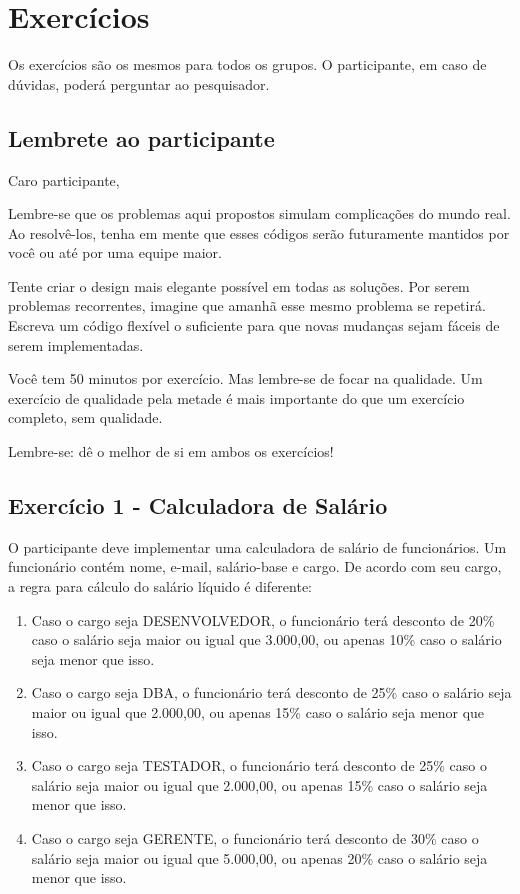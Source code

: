\chapter{Exercícios}
\label{ape:exercicios}

Os exercícios são os mesmos para todos os grupos. O participante, em caso de dúvidas, poderá perguntar ao pesquisador.

\section{Lembrete ao participante}

Caro participante,

Lembre-se que os problemas aqui propostos simulam complicações do mundo real. 
Ao resolvê-los, tenha em mente que esses códigos serão futuramente mantidos
por você ou até por uma equipe maior.

Tente criar o design mais elegante possível em todas as soluções. Por serem problemas
recorrentes, imagine que amanhã esse mesmo problema se repetirá.
Escreva um código flexível o suficiente para que novas mudanças sejam fáceis de serem 
implementadas.

Você tem 50 minutos por exercício. Mas lembre-se de focar na qualidade. Um exercício de 
qualidade pela metade é mais importante do que um exercício completo, sem qualidade.

Lembre-se: dê o melhor de si em ambos os exercícios!

\section{Exercício 1 - Calculadora de Salário}

O participante deve implementar uma calculadora de salário de funcionários. Um
funcionário contém nome, e-mail, salário-base e cargo. De acordo com seu cargo,
a regra para cálculo do salário líquido é diferente:

\begin{enumerate}
	\item Caso o cargo seja DESENVOLVEDOR, o funcionário terá desconto de 20\%
	caso o salário seja maior ou igual que 3.000,00, ou apenas 10\% caso o salário seja menor 
	que isso.
	
	\item Caso o cargo seja DBA, o funcionário terá desconto de 25\%
	caso o salário seja maior ou igual que 2.000,00, ou apenas 15\% caso o salário seja menor 
	que isso.

	\item Caso o cargo seja TESTADOR, o funcionário terá desconto de 25\%
	caso o salário seja maior ou igual que 2.000,00, ou apenas 15\% caso o salário seja menor 
	que isso.
	
	\item Caso o cargo seja GERENTE, o funcionário terá desconto de 30\%
	caso o salário seja maior ou igual que 5.000,00, ou apenas 20\% caso o salário seja menor 
	que isso.
\end{enumerate}

